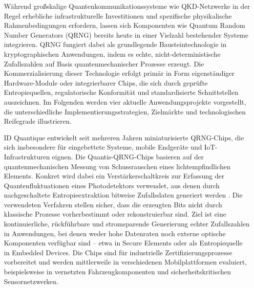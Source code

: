 Während großskalige Quantenkommunikationssysteme wie QKD-Netzwerke in der Regel erhebliche infrastrukturelle Investitionen und spezifische physikalische Rahmenbedingungen erfordern, lassen sich Komponenten wie Quantum Random Number Generators (QRNG) bereits heute in einer Vielzahl bestehender Systeme integrieren. QRNG fungiert dabei als grundlegende Bausteintechnologie in kryptographischen Anwendungen, indem es echte, nicht-deterministische Zufallszahlen auf Basis quantenmechanischer Prozesse erzeugt. Die Kommerzialisierung dieser Technologie erfolgt primär in Form eigenständiger Hardware-Module oder integrierbarer Chips, die sich durch geprüfte Entropiequellen, regulatorische Konformität und standardisierte Schnittstellen auszeichnen. Im Folgenden werden vier aktuelle Anwendungsprojekte vorgestellt, die unterschiedliche Implementierungsstrategien, Zielmärkte und technologischen Reifegrade illustrieren.

ID Quantique entwickelt seit mehreren Jahren miniaturisierte QRNG-Chips, die sich insbesondere für eingebettete Systeme, mobile Endgeräte und IoT-Infrastrukturen eignen. Die Quantis-QRNG-Chips basieren auf der quantenmechanischen Messung von Schussrauschen eines lichtempfindlichen Elements. Konkret wird dabei ein Verstärkerschaltkreis zur Erfassung der Quantenfluktuationen eines Photodetektors verwendet, aus denen durch nachgeschaltete Entropieextraktion bitweise Zufallsdaten generiert werden \cite{noauthor_quantis_2025}. Die verwendeten Verfahren stellen sicher, dass die erzeugten Bits nicht durch klassische Prozesse vorherbestimmt oder rekonstruierbar sind. Ziel ist eine kontinuierliche, rückführbare und stromsparende Generierung echter Zufallszahlen in Anwendungen, bei denen weder hohe Datenraten noch externe optische Komponenten verfügbar sind – etwa in Secure Elements oder als Entropiequelle in Embedded Devices. Die Chips sind für industrielle Zertifizierungsprozesse vorbereitet und werden mittlerweile in verschiedenen Mobilplattformen evaluiert, beispielsweise in vernetzten Fahrzeugkomponenten und sicherheitskritischen Sensornetzwerken.

